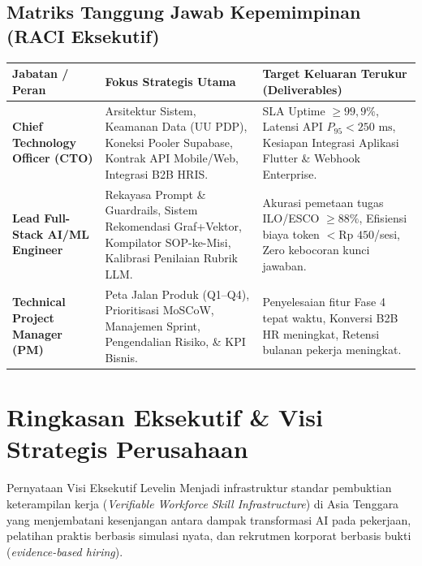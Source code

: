 \documentclass[11pt,a4paper]{report}
\begin{document}
\vspace{0.8cm}
\section*{Matriks Tanggung Jawab Kepemimpinan (RACI Eksekutif)}
\begin{tabularx}{\textwidth}{L{4.2cm} L{4.2cm} X}
\toprule
\textbf{Jabatan / Peran} & \textbf{Fokus Strategis Utama} & \textbf{Target Keluaran Terukur (Deliverables)} \\
\midrule
\textbf{Chief Technology Officer (CTO)} & Arsitektur Sistem, Keamanan Data (UU PDP), Koneksi Pooler Supabase, Kontrak API Mobile/Web, Integrasi B2B HRIS. & SLA Uptime $\ge 99{,}9\%$, Latensi API $P_{95} < 250\text{ ms}$, Kesiapan Integrasi Aplikasi Flutter \& Webhook Enterprise. \\
\textbf{Lead Full-Stack AI/ML Engineer} & Rekayasa Prompt \& Guardrails, Sistem Rekomendasi Graf+Vektor, Kompilator SOP-ke-Misi, Kalibrasi Penilaian Rubrik LLM. & Akurasi pemetaan tugas ILO/ESCO $\ge 88\%$, Efisiensi biaya token $< \text{Rp } 450$/sesi, Zero kebocoran kunci jawaban. \\
\textbf{Technical Project Manager (PM)} & Peta Jalan Produk (Q1--Q4), Prioritisasi MoSCoW, Manajemen Sprint, Pengendalian Risiko, \& KPI Bisnis. & Penyelesaian fitur Fase 4 tepat waktu, Konversi B2B HR meningkat, Retensi bulanan pekerja meningkat. \\
\bottomrule
\end{tabularx}

\tableofcontents
\clearpage

\chapter{Ringkasan Eksekutif \& Visi Strategis Perusahaan}

\begin{execbox}{Pernyataan Visi Eksekutif Levelin}
Menjadi infrastruktur standar pembuktian keterampilan kerja (\textit{Verifiable Workforce Skill Infrastructure}) di Asia Tenggara yang menjembatani kesenjangan antara dampak transformasi AI pada pekerjaan, pelatihan praktis berbasis simulasi nyata, dan rekrutmen korporat berbasis bukti (\textit{evidence-based hiring}).
\end{execbox}
\end{document}
